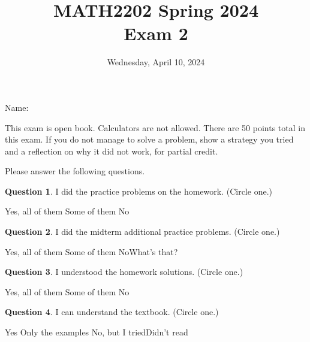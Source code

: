 \documentclass[11pt,oneside]{amsart}
\title{MATH2202 Spring 2024\\
Exam 2}
\author{Wednesday, April 10, 2024}
\theoremstyle{definition}
\newtheorem{question}{Question}
\theoremstyle{plain}
\begin{document}
\maketitle

Name: \underline{\hspace{6cm}}

This exam is open book. Calculators are not allowed. There are 50 points total in this exam. If you do not manage to solve a problem, show a strategy you tried and a reflection on why it did not work, for partial credit.

\vskip 2cm

Please answer the following questions.

\begin{question}
  I did the practice problems on the homework. (Circle one.)

  \hspace{1.5cm}Yes, all of them\hspace{1.5cm} Some of them\hspace{1.5cm} No
\end{question}

\begin{question}
  I did the midterm additional practice problems. (Circle one.)

  \hspace{1.5cm}Yes, all of them\hspace{1.5cm} Some of them\hspace{1.5cm} No\hspace{1.5cm}What's that?
\end{question}

\begin{question}
  I understood the homework solutions. (Circle one.)

  \hspace{1.5cm}Yes, all of them\hspace{1.5cm} Some of them\hspace{1.5cm} No
\end{question}

\begin{question}
  I can understand the textbook. (Circle one.)

  \hspace{1.5cm}Yes\hspace{1.5cm} Only the examples\hspace{1.5cm} No, but I tried\hspace{1.5cm}Didn't read
\end{question}
\end{document}

